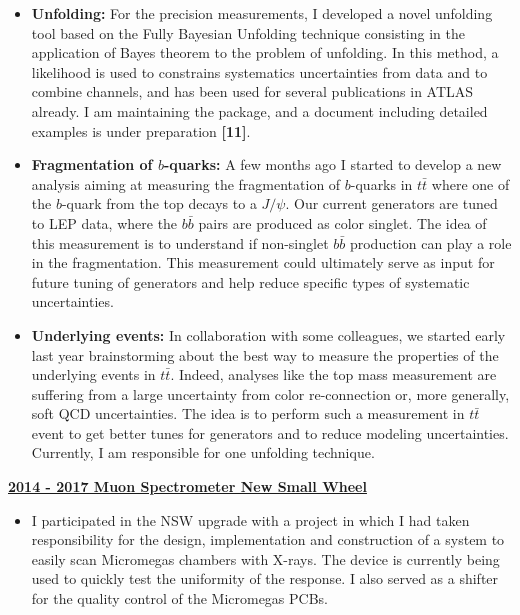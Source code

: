 \documentclass[12pt]{article}
\begin{document}
\begin{itemize}[leftmargin=1.3cm]
\item[] {\bf Unfolding: }
For the precision measurements, I developed a novel unfolding tool based on the Fully Bayesian Unfolding technique consisting in the application of Bayes theorem to the problem of unfolding. In this method, a likelihood is used to constrains systematics uncertainties from data and to combine channels, and has been used for several publications in ATLAS already. I am maintaining the package, and a document including detailed examples is under preparation {\bf \color{red} [11]}.

\item[] {\bf Fragmentation of $b$-quarks:}
A few months ago I started to develop a new analysis aiming at measuring the fragmentation of $b$-quarks in $t\bar{t}$ where one of the $b$-quark from the top decays to a $J/\psi$. Our current generators are tuned to LEP data, where the $b\bar{b}$ pairs are produced as color singlet. The idea of this measurement is to understand if non-singlet $b\bar{b}$ production can play a role in the fragmentation. This measurement could ultimately serve as input for future tuning of generators and help reduce specific types of systematic uncertainties.

\item[] {\bf Underlying events:}
In collaboration with some colleagues, we started early last year brainstorming about the best way to measure the properties of the underlying events in $t\bar{t}$. Indeed, analyses like the top mass measurement are suffering from a large uncertainty from color re-connection or, more generally, soft QCD uncertainties. The idea is to perform such a measurement in $t\bar{t}$ event to get better tunes for generators and to reduce modeling uncertainties. Currently,  I am responsible for one unfolding technique.


\end{itemize}
\vskip 0.4cm

{\bf  \underline{2014 - 2017  Muon Spectrometer New Small Wheel}}
\vskip 0.2cm
\begin{itemize}[leftmargin=1.3cm]
\itemsep0.8em
\item[] 
I participated in the NSW upgrade with a project in which I had taken responsibility for the design, implementation and construction of a system to easily scan Micromegas chambers with X-rays. The device is currently being used to quickly test the uniformity of the response. I also served as a shifter for the quality control of the Micromegas PCBs.
\end{itemize}
\vskip 0.4cm
\end{document}
